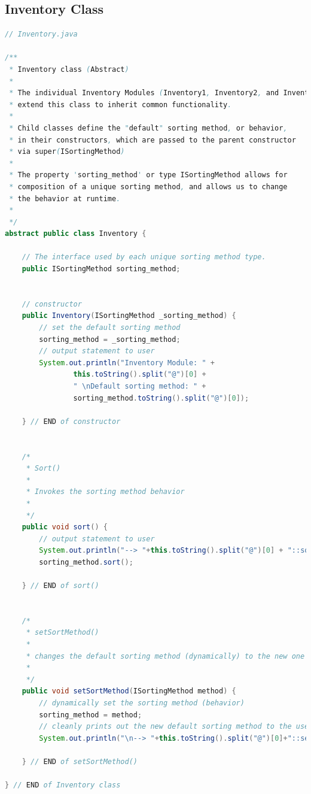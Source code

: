 \documentclass[12pt]{article}
\begin{document}
\subsection*{Inventory Class}
\begin{lstlisting}[language=Java]
// Inventory.java

/**
 * Inventory class (Abstract)
 * 
 * The individual Inventory Modules (Inventory1, Inventory2, and Inventory3)
 * extend this class to inherit common functionality.
 * 
 * Child classes define the "default" sorting method, or behavior,
 * in their constructors, which are passed to the parent constructor
 * via super(ISortingMethod)
 * 
 * The property 'sorting_method' or type ISortingMethod allows for
 * composition of a unique sorting method, and allows us to change
 * the behavior at runtime.
 *
 */
abstract public class Inventory {

    // The interface used by each unique sorting method type.
    public ISortingMethod sorting_method;
    
    
    // constructor
    public Inventory(ISortingMethod _sorting_method) {
        // set the default sorting method
        sorting_method = _sorting_method;
        // output statement to user
        System.out.println("Inventory Module: " + 
                this.toString().split("@")[0] +
                " \nDefault sorting method: " +
                sorting_method.toString().split("@")[0]);
    
    } // END of constructor
    
    
    /*
     * Sort()
     * 
     * Invokes the sorting method behavior
     * 
     */
    public void sort() {
        // output statement to user
        System.out.println("--> "+this.toString().split("@")[0] + "::sort()\nThe sorting method is: " + sorting_method.toString().split("@")[0]);
        sorting_method.sort();
    
    } // END of sort()

    
    /*
     * setSortMethod()
     * 
     * changes the default sorting method (dynamically) to the new one chosen by the user
     * 
     */
    public void setSortMethod(ISortingMethod method) {
        // dynamically set the sorting method (behavior)
        sorting_method = method;
        // cleanly prints out the new default sorting method to the user
        System.out.println("\n--> "+this.toString().split("@")[0]+"::setSortMethod(ISortingMethod method)\nDynamically set sorting method to: " + sorting_method.toString().split("@")[0]);
    
    } // END of setSortMethod()

} // END of Inventory class

\end{lstlisting}
\end{document}
